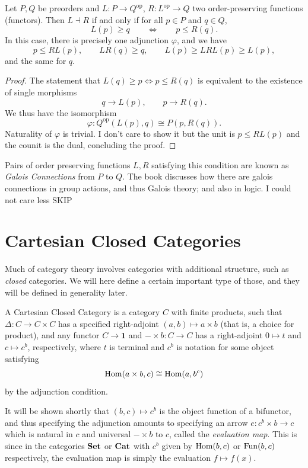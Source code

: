 \begin{theorem}\label{thm:4.6}
	Let $P,Q$ be preorders and $L : P \to Q^{\mathrm{op} } $, $R : L^{\mathrm{op} }  \to Q$ two order-preserving functions (functors). Then $L\dashv R$ if and only if for all $p\in P$ and $q\in Q$,
	\[
		L(p)\geq q \qquad \iff  \qquad p\leq R(q)
	.\]
	In this case, there is precisely one adjunction $\varphi $, and we have
	\[
		p\leq RL(p),\qquad LR(q)\geq q,\qquad L(p)\geq LRL(p)\geq L(p),
	\]
	and the same for $q$.
\end{theorem}
\begin{proof}
	The statement that $L(q)\geq p \iff p\leq R(q)$ is equivalent to the existence of single morphisms
	\[
		q\to L(p),\qquad p\to R(q)
	.\]
	We thus have the isomorphism
	\[
		\varphi : Q^{\mathrm{op} } (L(p),q) \cong P(p,R(q))
	.\]
	Naturality of $\varphi $ is trivial. I don't care to show it but the unit is $p\leq RL(p)$ and the counit is the dual, concluding the proof.
\end{proof}

Pairs of order preserving functions $L,R$ satisfying this condition are known as \emph{Galois Connections} from $P$ to $Q$. The book discusses how there are galois connections in group actions, and thus Galois theory; and also in logic. I could not care less SKIP

\section{Cartesian Closed Categories}

Much of category theory involves categories with additional structure, such as \emph{closed} categories. We will here define a certain important type of those, and they will be defined in generality later.

\begin{definition}\label{dfn:4.5}
	A Cartesian Closed Category is a category $C$ with finite products, such that $\Delta : C \to C\times C$ has a specified right-adjoint $(a,b)\mapsto a\times b$ (that is, a choice for product), and any functor $C\to \mathbf{1} $ and $-\times b : C\to C$ has a right-adjoint $0\mapsto t$ and $c\mapsto c^b$, respectively, where $t$ is terminal and $c^b$ is notation for some object satisfying
	\[
		\operatorname{Hom}(a\times b, c) \cong \operatorname{Hom}(a, b^c) 
	\]
	by the adjunction condition.
\end{definition}

It will be shown shortly that  $(b,c)\mapsto c^b$ is the object function of a bifunctor, and thus specifying the adjunction amounts to specifying an arrow $e : c^b \times b \to c$ which is natural in $c$ and universal $-\times b$ to $c$, called the \emph{evaluation map}. This is since in the categories $\mathbf{Set} $ or $\mathbf{Cat} $ with $c^b$ given by $\operatorname{Hom}(b, c) $ or $\operatorname{Fun}(b,c)$ respectively, the evaluation map is simply the evaluation $f\mapsto f(x)$.

